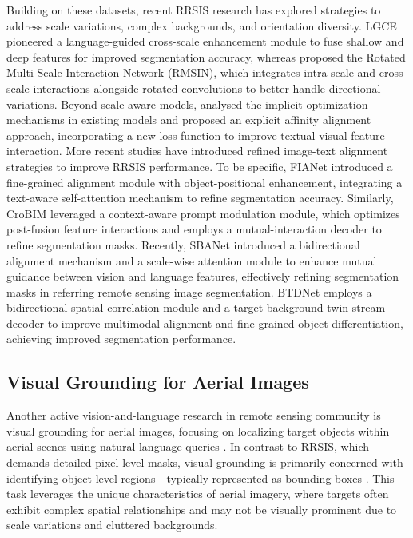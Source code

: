 Building on these datasets, recent RRSIS research has explored strategies to address scale variations, complex backgrounds, and orientation diversity. LGCE \citep{yuan2024rrsis} pioneered a language-guided cross-scale enhancement module to fuse shallow and deep features for improved segmentation accuracy, whereas \cite{liu2024rotated} proposed the Rotated Multi-Scale Interaction Network (RMSIN), which integrates intra-scale and cross-scale interactions alongside rotated convolutions to better handle directional variations. Beyond scale-aware models, \cite{pan2024rethinking} analysed the implicit optimization mechanisms in existing models and proposed an explicit affinity alignment approach, incorporating a new loss function to improve textual-visual feature interaction. More recent studies have introduced refined image-text alignment strategies to improve RRSIS performance. To be specific, FIANet \citep{lei2024exploring} introduced a fine-grained alignment module with object-positional enhancement, integrating a text-aware self-attention mechanism to refine segmentation accuracy. Similarly, CroBIM \citep{dong2024cross} leveraged a context-aware prompt modulation module, which optimizes post-fusion feature interactions and employs a mutual-interaction decoder to refine segmentation masks. Recently, SBANet \citep{li2025scale} introduced a bidirectional alignment mechanism and a scale-wise attention module to enhance mutual guidance between vision and language features, effectively refining segmentation masks in referring remote sensing image segmentation. BTDNet \citep{zhang2025referring} employs a bidirectional spatial correlation module and a target-background twin-stream decoder to improve multimodal alignment and fine-grained object differentiation, achieving improved segmentation performance.

\subsection{Visual Grounding for Aerial Images}
\label{sec:2.3}
Another active vision-and-language research in
remote sensing community is visual grounding for aerial images, focusing on localizing target objects within aerial scenes using natural language queries \citep{sun2022visual, zhao2021high, zhan2023rsvg}. In contrast to RRSIS, which demands detailed pixel-level masks, visual grounding is primarily concerned with identifying object-level regions—typically represented as bounding boxes \citep{sun2022visual}. This task leverages the unique characteristics of aerial imagery, where targets often exhibit complex spatial relationships and may not be visually prominent due to scale variations and cluttered backgrounds.

